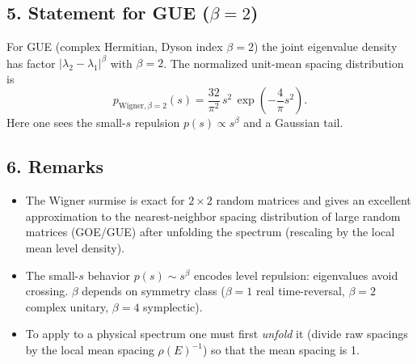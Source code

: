 \documentclass[10pt]{article}
\begin{document}
\subsection*{5. Statement for GUE ($\beta=2$)}

For GUE (complex Hermitian, Dyson index $\beta=2$) the joint eigenvalue 
density has factor $|\lambda_2-\lambda_1|^\beta$ with $\beta=2$. The 
normalized unit-mean spacing distribution is
\begin{equation}
\boxed{p_{\mathrm{Wigner},\beta=2}(s) = \frac{32}{\pi^2}\,s^2\,
\exp\!\left(-\frac{4}{\pi}s^2\right).}
\end{equation}
Here one sees the small-$s$ repulsion $p(s)\propto s^\beta$ and a 
Gaussian tail.

\subsection*{6. Remarks}

\begin{itemize}
\item The Wigner surmise is exact for $2\times2$ random matrices and 
gives an excellent approximation to the nearest-neighbor spacing 
distribution of large random matrices (GOE/GUE) after unfolding the 
spectrum (rescaling by the local mean level density).
\item The small-$s$ behavior $p(s)\sim s^\beta$ encodes level repulsion: 
eigenvalues avoid crossing. $\beta$ depends on symmetry class 
($\beta=1$ real time-reversal, $\beta=2$ complex unitary, 
$\beta=4$ symplectic).
\item To apply to a physical spectrum one must first \emph{unfold} it 
(divide raw spacings by the local mean spacing $\rho(E)^{-1}$) so that 
the mean spacing is 1.
\end{itemize}
\end{document}
